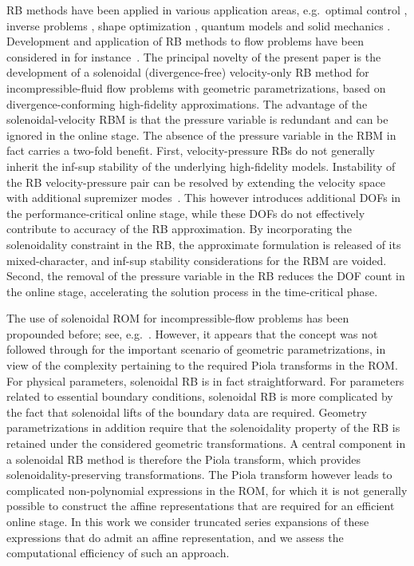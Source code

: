 \documentclass[onecolumn, twoside, a4paper, 11pt]{article}
\begin{document}
RB methods have been applied in various application areas,
e.g.~optimal control \cite{Ravindran2000roa,Ito2001rbm},
inverse problems \cite{Liu2005iit,Lieberman2010psm},
shape optimization \cite{Manzoni2012sov,Rozza2011rba},
quantum models \cite{Pau2007rbm}
and solid mechanics \cite{Noor1980rbt,Krysl2001dmr}. Development and
application of RB methods to flow problems have been considered in for
instance~\cite{Peterson1989rbm,Gunzburger2012fem,Iollo2000spp,Stabile2017fvp}.
The principal novelty of the present paper is the development of a solenoidal (divergence-free)
velocity-only RB method for incompressible-fluid flow problems with geometric parametrizations, based on
divergence-conforming high-fidelity approximations. The advantage of the solenoidal-velocity RBM is that
the pressure variable
is redundant and can be ignored in the online stage. The absence of the pressure
variable in the RBM in fact carries a two-fold benefit. First, velocity-pressure RBs do not generally inherit
the inf-sup stability of the underlying high-fidelity models. Instability of the RB
velocity-pressure pair can be resolved by extending the velocity space with additional
supremizer modes~\cite{Ballarin2015ssp,Stabile2017fvp}. This however introduces additional DOFs in the
performance-critical online stage, while these DOFs do not effectively contribute to
accuracy of the RB approximation. By incorporating the solenoidality constraint in the RB,
the approximate formulation is released of its mixed-character, and inf-sup stability
considerations for the RBM are voided. Second, the removal of the pressure variable in the RB reduces
the DOF count in the online stage, accelerating the solution process in the time-critical
phase.

The use of solenoidal ROM for incompressible-flow problems has been propounded before;
see, e.g.~\cite{Ballarin2015ssp,Lovgren2006rbe}. However, it appears that the concept was not followed
through for the important scenario of geometric parametrizations, in view of the complexity pertaining
to the required Piola transforms in the ROM. For physical parameters, solenoidal RB is in fact
straightforward. For parameters
related to essential boundary conditions, solenoidal RB is more complicated by the fact that solenoidal
lifts of the boundary data are required. Geometry parametrizations in addition require that the
solenoidality property of the RB is retained under the considered geometric transformations. A
central component in a solenoidal RB method is therefore the Piola transform, which provides
solenoidality-preserving transformations. The Piola transform however leads to complicated
non-polynomial expressions in the ROM, for which it is not generally possible to construct
the affine representations that are required for an efficient online stage. In this work we consider
truncated series expansions of these expressions that do admit an affine representation, and
we assess the computational efficiency of such an approach.
\end{document}
